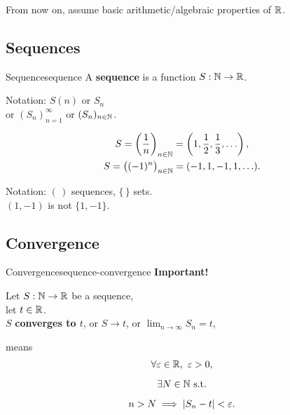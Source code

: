 \begin{remark}
  From now on, assume basic arithmetic/algebraic properties of $\mathbb{R}$.
\end{remark}

\subsection{Sequences}

\begin{definition}{Sequence}{sequence}
  A \textbf{sequence} is a function $S:\mathbb{N}\to\mathbb{R}$.
  \begin{flushleft}
    Notation: $S(n)$ or $S_n$\\
    or $(S_n)_{n=1}^{\infty}$ or $(S_n)_{n\in\mathbb{N}}$.
  \end{flushleft}
\end{definition}

\begin{example}
  \begin{gather*}
    S=\left(\frac1n\right)_{n\in\mathbb{N}}
    =\left(1,\frac12,\frac13,\ldots\right),\\
    S=\bigl((-1)^n\bigr)_{n\in\mathbb{N}}=(-1,1,-1,1,\ldots).
  \end{gather*}
\end{example}

\begin{note}
  Notation: $(\,)$ sequences, $\{\,\}$ sets.\\
  $(1,-1)$ is not $\{1,-1\}$.
\end{note}

\subsection{Convergence}

\begin{definition}{Convergence}{sequence-convergence}
  \textbf{Important!}
  \begin{flushleft}
    Let $S:\mathbb{N}\to\mathbb{R}$ be a sequence,\\
    let $t\in\mathbb{R}$.\\[0.5em]
    $S$ \textbf{converges to $t$}, or $S\to t$,
    or $\lim_{n\to\infty}S_n=t$,
  \end{flushleft}
  means
  \[
    \begin{gathered}
      \forall\varepsilon\in\mathbb{R},\ \varepsilon>0,\\[0.5em]
      \exists N\in\mathbb{N}\text{ s.t.}\\[0.5em]
      n>N\implies\left\lvert S_n-t \right\rvert<\varepsilon.
    \end{gathered}
  \]
\end{definition}

